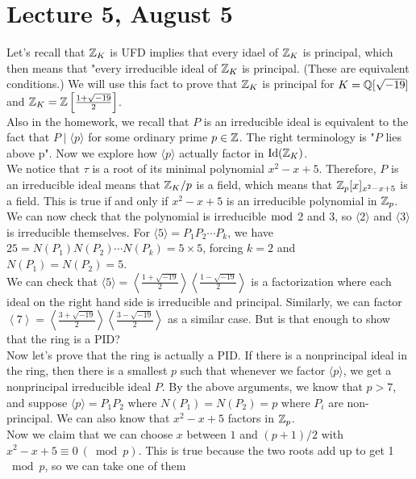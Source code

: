 \documentclass[12pt,twoside=semi,openright,numbers=noenddot]{scrbook}
\begin{document}
\section{Lecture 5, August 5}
Let's recall that $\mathbb Z_K$ is UFD implies that every idael of $\mathbb Z_K$ is principal, which then means that "every irreducible ideal of $\mathbb Z_K$ is principal. (These are equivalent conditions.)
We will use this fact to prove that $\mathbb Z_K$ is principal for $K=\mathbb Q[\sqrt{-19}]$ and $\mathbb Z_K = \mathbb Z\left[\frac{1+\sqrt{-19}}{2}\right]$. \\
Also in the homework, we recall that $P$ is an irreducible ideal is equivalent to the fact that $P \mid \langle p \rangle$ for some ordinary prime $p \in \mathbb Z$. The right terminology is "$P$ lies above p". Now we 
explore how $\langle p \rangle$ actually factor in $\text{Id}(\mathbb Z_K)$. \\
We notice that $\tau$ is a root of its minimal polynomial $x^2-x+5$. Therefore, $P$ is an irreducible ideal means that $\mathbb Z_K/p$ is a field, which means that 
$\mathbb Z_p[x]_{x^2-x+5}$ is a field. This is true if and only if $x^2-x+5$ is an irreducible polynomial in $\mathbb Z_p$. \\
We can now check that the polynomial is irreducible $\bmod$ 2 and 3, so $\langle 2 \rangle$ and $\langle 3 \rangle$ is irreducible themselves.
For $\langle 5 \rangle =P_1P_2\cdots P_k$, we have $25 = N(P_1)N(P_2)\cdots N(P_k) = 5\times 5$, forcing $k=2$ and $N(P_1)=N(P_2)=5$. \\
We can check that $\langle 5 \rangle = \left\langle \frac{1+\sqrt{-19}}{2}\right\rangle \left\langle \frac{1-\sqrt{-19}}{2}\right\rangle$ is a factorization where 
each ideal on the right hand side is irreducible and principal. Similarly, we can factor $\left\langle 7\right\rangle =\left\langle \frac{3+\sqrt{-19}}{2}\right\rangle \left\langle \frac{3-\sqrt{-19}}{2}\right\rangle $
as a similar case. But is that enough to show that the ring is a PID? \\
Now let's prove that the ring is actually a PID. If there is a nonprincipal ideal in the ring, then there is a smallest $p$ such that 
whenever we factor $\langle p \rangle$, we get a nonprincipal irreducible ideal $P$. By the above arguments, we know that $p>7$, and suppose $\langle p \rangle = P_1P_2$ where 
$N(P_1) = N(P_2) = p$ where $P_i$ are non-principal. We can also know that $x^2-x+5$ factors in $\mathbb Z_p$. \\
Now we claim that we can choose $x$ between $1$ and $(p+1)/2$ with $x^2-x+5\equiv 0 \ (\bmod p)$. This is true because the two roots add up to get 1 $\bmod p$, so we can take one of them 
\end{document}
